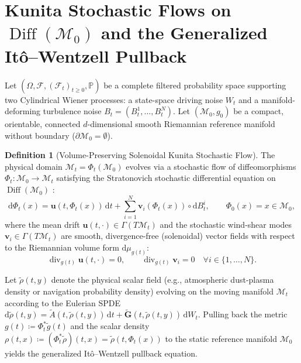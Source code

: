 \documentclass[11pt,a4paper,reqno]{article}
\theoremstyle{definition}
\newtheorem{definition}[theorem]{Definition}
\theoremstyle{remark}
\begin{document}
\section[Kunita Stochastic Flows on Diff(M0) and the Generalized Ito-Wentzell Pullback]{Kunita Stochastic Flows on $\operatorname{Diff}(\mathcal{M}_0)$ and the Generalized It\^o--Wentzell Pullback}

Let $(\Omega, \mathcal{F}, (\mathcal{F}_t)_{t \ge 0}, \mathbb{P})$ be a complete filtered probability space supporting two Cylindrical Wiener processes: a state-space driving noise $W_t$ and a manifold-deforming turbulence noise $B_t = (B_t^1, \dots, B_t^N)$. Let $(\mathcal{M}_0, g_0)$ be a compact, orientable, connected $d$-dimensional smooth Riemannian reference manifold without boundary ($\partial\mathcal{M}_0 = \emptyset$).

\begin{definition}[Volume-Preserving Solenoidal Kunita Stochastic Flow]
The physical domain $\mathcal{M}_t = \Phi_t(\mathcal{M}_0)$ evolves via a stochastic flow of diffeomorphisms $\Phi_t : \mathcal{M}_0 \to \mathcal{M}_t$ satisfying the Stratonovich stochastic differential equation on $\operatorname{Diff}(\mathcal{M}_0)$ \cite{kunita1990stochastic, baxendale1984brownian}:
\begin{equation}\label{eq:kunita_flow}
  \mathrm{d}\Phi_t(x) = \mathbf{u}(t, \Phi_t(x))\,\mathrm{d}t + \sum_{i=1}^N \mathbf{v}_i(\Phi_t(x)) \circ \mathrm{d}B_t^i, \qquad \Phi_0(x) = x \in \mathcal{M}_0,
\end{equation}
where the mean drift $\mathbf{u}(t,\cdot) \in \Gamma(T\mathcal{M}_t)$ and the stochastic wind-shear modes $\mathbf{v}_i \in \Gamma(T\mathcal{M}_t)$ are smooth, divergence-free (solenoidal) vector fields with respect to the Riemannian volume form $\mathrm{d}\mu_{g(t)}$:
\begin{equation}\label{eq:solenoidal_cond}
  \operatorname{div}_{g(t)} \mathbf{u}(t, \cdot) = 0, \qquad \operatorname{div}_{g(t)} \mathbf{v}_i = 0 \quad \forall i \in \{1, \dots, N\}.
\end{equation}
\end{definition}

Let $\tilde{\rho}(t, y)$ denote the physical scalar field (e.g., atmospheric dust-plasma density or navigation probability density) evolving on the moving manifold $\mathcal{M}_t$ according to the Eulerian SPDE $\mathrm{d}\tilde{\rho}(t,y) = \tilde{A}(t,\tilde{\rho}(t,y))\,\mathrm{d}t + \tilde{\mathbf{G}}(t,\tilde{\rho}(t,y))\,\mathrm{d}W_t$. Pulling back the metric $g(t) \coloneqq \Phi_t^* \tilde{g}(t)$ and the scalar density $\rho(t, x) \coloneqq (\Phi_t^* \tilde{\rho})(t, x) = \tilde{\rho}(t, \Phi_t(x))$ to the static reference manifold $\mathcal{M}_0$ yields the generalized It\^o--Wentzell pullback equation.
\end{document}

